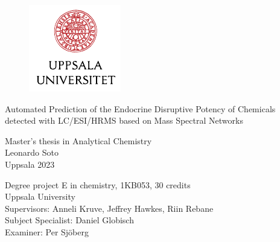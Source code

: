 \begin{titlepage}

\vspace*{\fill}
\begin{figure}
   \begin{center}
     \includegraphics[scale=1.5]{include/img/other/UU_logo_color_crop.pdf}
   \end{center}
\end{figure}

\center


\vspace{4mm}
\Large{Automated Prediction of the Endocrine Disruptive Potency of Chemicals detected with LC/ESI/HRMS based on Mass Spectral Networks}


\begin{center}
		\vfill
		\large{
		Master's thesis in Analytical Chemistry \\
		\bigskip
		Leonardo Soto\\
		\bigskip
		Uppsala 2023
		}
\end{center}
		\vfill
\begin{flushleft}
		\vfill
		\footnotesize
		Degree project E in chemistry, 1KB053, 30 credits \\
		Uppsala University \\
		Supervisors: Anneli Kruve, Jeffrey Hawkes, Riin Rebane \\
		Subject Specialist: Daniel Globisch \\
		Examiner: Per Sjöberg \\
	\end{flushleft}





\end{titlepage}



